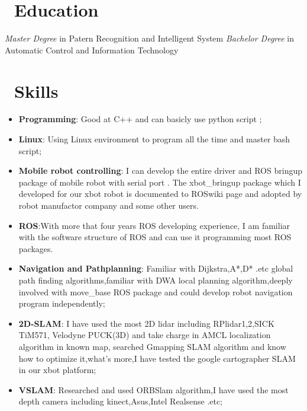 \documentclass{resume}
\begin{document}




\section{\faGraduationCap\ Education}
\textit{Master Degree} in Patern Recognition and Intelligent System
\textit{Bachelor Degree} in Automatic Control and Information Technology

\section{\faCogs\  Skills}
\begin{itemize}[parsep=0.5ex]
  \item \textbf{Programming}: Good at C++ and can basicly use python script ;
  \item \textbf{Linux}: Using Linux environment to program all the time and master bash script;
  \item \textbf{Mobile robot controlling}:  I can develop the entire driver and ROS bringup package of mobile robot with serial port . The xbot\_bringup package which I developed for our xbot robot is documented to ROSwiki page and adopted by robot manufactor company and some other users.
  \item \textbf{ROS}:With more that four years ROS developing experience, I am familiar with the software structure of ROS and can use it programming most ROS packages.
  \item \textbf{Navigation and Pathplanning}: Familiar with Dijkstra,A*,D* .etc global path finding algorithms,familiar with DWA local planning algorithm,deeply involved with move\_base ROS package and could develop robot navigation program independently;
  \item \textbf{2D-SLAM}: I have used the most 2D lidar including RPlidar1,2,SICK TiM571, Velodyne PUCK(3D) and take charge in AMCL localization algorithm in known map, searched Gmapping SLAM algorithm and know how to optimize it,what's more,I have tested the  google cartographer SLAM in our xbot platform;
  \item \textbf{VSLAM}: Researched and used ORBSlam algorithm,I have used the most depth camera including kinect,Asus,Intel Realsense .etc;
  
\end{itemize}
\end{document}
